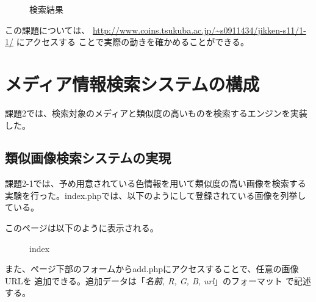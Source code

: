 \documentclass[a4paper,9pt]{jsarticle}
\begin{document}
\begin{figure}[H]
 \caption{検索結果}
 \begin{center}
 \end{center}
\end{figure}
この課題については、
\url{http://www.coins.tsukuba.ac.jp/~s0911434/jikken-s11/1-1/} にアクセスする
ことで実際の動きを確かめることができる。
\section{メディア情報検索システムの構成}
課題2では、検索対象のメディアと類似度の高いものを検索するエンジンを実装
した。
\subsection{類似画像検索システムの実現}
課題2-1では、予め用意されている色情報を用いて類似度の高い画像を検索する
実験を行った。index.phpでは、以下のようにして登録されている画像を列挙し
ている。


このページは以下のように表示される。
\begin{figure}[H]
 \caption{index}
 \begin{center}
 \end{center}
\end{figure}
また、ページ下部のフォームからadd.phpにアクセスすることで、任意の画像URLを
追加できる。追加データは「{\itshape 名前, R, G, B, url}」のフォーマット
で記述する。
\end{document}
